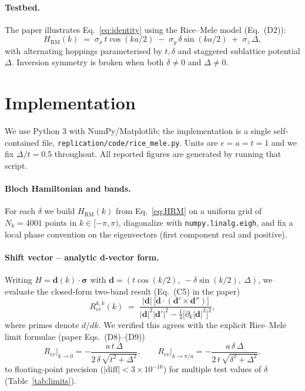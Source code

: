 \documentclass[11pt]{article}
\begin{document}
\paragraph{Testbed.} The paper illustrates Eq.~\eqref{eq:identity}
using the Rice--Mele model (Eq.~(D2)):
\begin{equation}
  H_{\text{RM}}(k) \;=\;
  \sigma_x\, t\cos(ka/2)
  \;-\;\sigma_y\, \delta\sin(ka/2)
  \;+\;\sigma_z\, \Delta,
  \label{eq:HRM}
\end{equation}
with alternating hoppings parameterised by $t, \delta$ and staggered
sublattice potential $\Delta$. Inversion symmetry is broken when both
$\delta\ne 0$ and $\Delta\ne 0$.

\section{Implementation}

We use Python 3 with NumPy/Matplotlib; the implementation is a
single self-contained file,
\texttt{replication/code/rice\_mele.py}. Units are $e=a=t=1$ and
we fix $\Delta/t = 0.5$ throughout. All reported figures are
generated by running that script.

\paragraph{Bloch Hamiltonian and bands.}
For each $\delta$ we build $H_{\text{RM}}(k)$ from
Eq.~\eqref{eq:HRM} on a uniform grid of $N_k=4001$ points in
$k\in[-\pi,\pi)$, diagonalize with
\texttt{numpy.linalg.eigh}, and fix a local phase convention on the
eigenvectors (first component real and positive).

\paragraph{Shift vector -- analytic d-vector form.}
Writing $H = \mathbf d(k)\cdot\boldsymbol{\sigma}$ with
$\mathbf d = (t\cos(k/2),\ -\delta\sin(k/2),\ \Delta)$, we evaluate
the closed-form two-band result (Eq.~(C5) in the paper)
\begin{equation}
  R^{k,k}_{cv}(k)
  \;=\;
  \frac{|\mathbf d|\,\bigl[\mathbf d\cdot(\mathbf d'\times\mathbf d'')\bigr]}
       {|\mathbf d|^2|\mathbf d'|^2 - \tfrac14\bigl[\partial_k|\mathbf d|^2\bigr]^2},
  \label{eq:R_dvec}
\end{equation}
where primes denote $d/dk$. We verified this agrees with the
explicit Rice--Mele limit formulae (paper Eqs.~(D8)--(D9))
\[
  R_{cv}\bigl|_{k\to0}
  = -\frac{a\,t\,\Delta}{2\,\delta\,\sqrt{t^2+\Delta^2}},
  \qquad
  R_{cv}\bigl|_{k\to\pi/a}
  = -\frac{a\,\delta\,\Delta}{2\,t\,\sqrt{\delta^2+\Delta^2}},
\]
to floating-point precision ($|\mathrm{diff}| < 3\times 10^{-16}$)
for multiple test values of $\delta$ (Table~\ref{tab:limits}).
\end{document}
